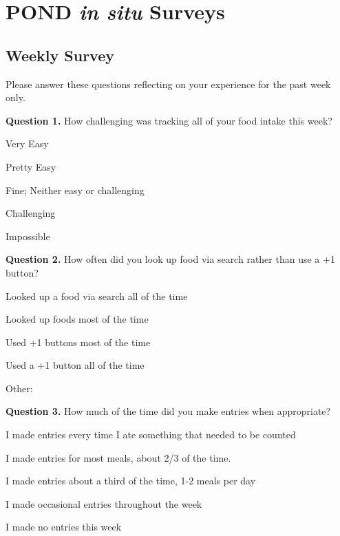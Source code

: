 \chapter{POND \textit{in situ} Surveys}
\label{cha:app_POND_insitu_surveys}

\section{Weekly Survey}
Please answer these questions reflecting on your experience for the past week only. 

\noindent\textbf{Question 1.}
How challenging was tracking all of your food intake this week? 

\begin{itemize*}
\item	Very Easy
\item	Pretty Easy
\item	Fine; Neither easy or challenging
\item	Challenging
\item	Impossible
\end{itemize*}

\noindent\textbf{Question 2.}
How often did you look up food via search rather than use a +1 button? 

\begin{itemize*}
\item	Looked up a food via search all of the time
\item	Looked up foods most of the time
\item	Used +1 buttons most of the time
\item	Used a +1 button all of the time
\item	Other:  
\end{itemize*}

\noindent\textbf{Question 3.}
How much of the time did you make entries when appropriate? 

\begin{itemize*}
\item	I made entries every time I ate something that needed to be counted
\item	I made entries for most meals, about 2/3 of the time.
\item	I made entries about a third of the time, 1-2 meals per day
\item	I made occasional entries throughout the week
\item	I made no entries this week
\end{itemize*}

